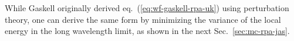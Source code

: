 

While Gaskell originally derived eq.~(\ref{eq:wf-gaskell-rpa-uk}) using perturbation theory, one can derive the same form by minimizing the variance of the local energy in the long wavelength limit, as shown in the next Sec.~\ref{sec:mc-rpa-jas}.